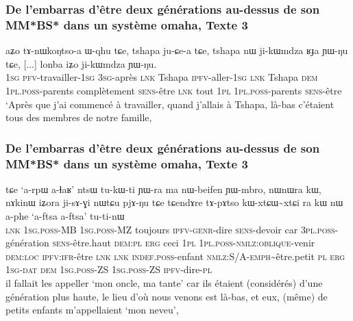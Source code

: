 \documentclass[xcolor=table]{beamer}
\newcommand{\tld}{\textasciitilde{}}
\newcommand{\ipa}[1]{{\phon #1}} %
\begin{document}
  \begin{frame} 
 \frametitle{De l'embarras d'être deux générations au-dessus de son MM*BS* dans un système omaha, Texte 3} 
 \begin{exe}
\ex 
\gll 
\ipa{aʑo} 	\ipa{tɤ-nɯkoŋtso-a} 	\ipa{ɯ-qhu} 	\ipa{tɕe,} 	\ipa{tshapa} 	\ipa{ju-ɕe-a} 	\ipa{tɕe,} 	\ipa{tshapa} 	\ipa{nɯ} 	\ipa{ji-kɯmdza} 	\ipa{ʁɟa} 	\ipa{ɲɯ-ŋu} 	\ipa{tɕe,} 	[...] \ipa{lonba} 	\ipa{iʑo} 	\ipa{ji-kɯmdza} 	\ipa{ɲɯ-ŋu.}  \\
\textsc{1sg} \textsc{pfv}-travailler-\textsc{1sg} \textsc{3sg}-après \textsc{lnk} Tshapa \textsc{ipfv}-aller-\textsc{1sg} \textsc{lnk} Tshapa \textsc{dem} \textsc{1pl.poss}-parents  complètement \textsc{sens}-être \textsc{lnk} { } tout \textsc{1pl} \textsc{1pl.poss}-parents  \textsc{sens}-être \\
\glt `Après que j'ai commencé à travailler, quand j'allais à Tshapa, là-bas c'étaient tous des membres de notre famille,
\end{exe}
\end{frame}


  \begin{frame} 
 \frametitle{De l'embarras d'être deux générations au-dessus de son MM*BS* dans un système omaha, Texte 3} 
 \begin{exe}
\ex 
\gll 
\ipa{tɕe} 	`\ipa{a-rpɯ} 	\ipa{a-ɬaʁ}' 	\ipa{ntsɯ} 	\ipa{tu-kɯ-ti} 	\ipa{ɲɯ-ra} 	\ipa{ma} 	\ipa{nɯ-}beifen 	\ipa{ɲɯ-mbro,} 	\ipa{nɯnɯra} 	\ipa{kɯ,} 	\ipa{nɤkinɯ} 	\ipa{iʑora} 	\ipa{ji-sɤ-ɣi} 	\ipa{nɯtɕu} 	\ipa{pjɤ-ŋu} 	\ipa{tɕe}  \ipa{tɕendɤre} 	\ipa{tɤ-pɤtso} 	\ipa{kɯ-xtɕɯ\tld{}xtɕi} 	\ipa{ra} 	\ipa{kɯ} 	\ipa{nɯ} 	\ipa{a-phe} `\ipa{a-ftsa} 	\ipa{a-ftsa}' 	\ipa{tu-ti-nɯ}\\
\textsc{lnk} \textsc{1sg.poss}-MB  \textsc{1sg.poss}-MZ toujours \textsc{ipfv-genr}-dire \textsc{sens}-devoir car \textsc{3pl.poss}-génération \textsc{sens}-être.haut \textsc{dem:pl} \textsc{erg} ceci \textsc{1pl} \textsc{1pl.poss-nmlz:oblique}-venir \textsc{dem:loc} \textsc{ipfv:ifr}-être \textsc{lnk}  \textsc{lnk} \textsc{indef.poss}-enfant  \textsc{nmlz:S/A-emph}\tld{}être.petit \textsc{pl} \textsc{erg} \textsc{1sg-dat} \textsc{dem} \textsc{1sg.poss}-ZS \textsc{1sg.poss}-ZS \textsc{ipfv}-dire-\textsc{pl} \\ 
\glt il fallait les appeller `mon oncle, ma tante' car ils étaient (considérés) d'une génération plus haute, le lieu d'où nous venons est là-bas, et eux, (même) de petits enfants m'appellaient  `mon neveu',
\end{exe}
\end{frame}
\end{document}
